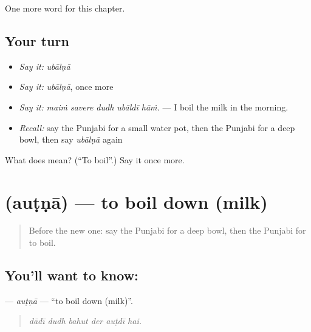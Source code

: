 \begin{grammarlens}[title={What you've built}]
One more word for this chapter.
\end{grammarlens}

\subsection*{Your turn}
\begin{itemize}
\raggedright
  \item \emph{Say it:} \emph{ubālṇā}
  \item \emph{Say it:} \emph{ubālṇā}, once more
  \item \emph{Say it:} \emph{maiṁ savere dudh ubāldī hāṁ.} — I boil the milk in the morning.
  \item \emph{Recall:} say the Punjabi for a small water pot, then the Punjabi for a deep bowl, then say \emph{ubālṇā} again
\end{itemize}

\begin{tcolorbox}[breakable,colback=teal!4,colframe=teal!35!black,title={Before you move on}]
What does  mean? (\textquotedblleft{}To boil\textquotedblright{}.) Say it once more.
\end{tcolorbox}
\section[\texorpdfstring{\pa{ਔਟਣਾ} (auṭṇā)}{ਔਟਣਾ (auṭṇā)}]{ (auṭṇā) — to boil down (milk)}

\label{lesson:PA-C237-autna}



\begin{quote}
Before the new one: say the Punjabi for a deep bowl, then the Punjabi for to boil.
\end{quote}

\subsection*{You'll want to know: }
\textbf{} — \emph{auṭṇā} — \textquotedblleft{}to boil down (milk)\textquotedblright{}.

\begin{quote}
     
\end{quote}

\begin{quote}
\emph{dādī dudh bahut der auṭdī hai.}
\end{quote}

